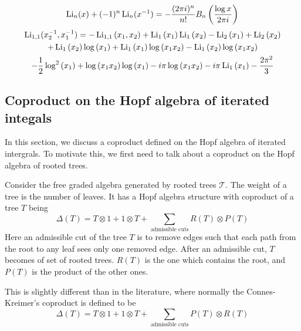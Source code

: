 \begin{example}
\begin{equation}\label{eq: Goncharov inversion depth 1}
\operatorname{Li}_n(x)+(-1)^n\operatorname{Li}_n(x^{-1})=-\dfrac{(2\pi i)^n}{n!}B_n\left(\frac{\log x}{2\pi i}\right)
\end{equation}
\begin{multline}\label{eq: Goncharov inversion depth 2}
\operatorname{Li}_{1,1}(x_2^{-1},x_1^{-1})=-\operatorname{Li}_{1,1}\left(x_1,x_2\right)+\operatorname{Li}_1\left(x_1\right)\operatorname{Li}_1\left(x_2\right)-\operatorname{Li}_2\left(x_1\right)+\operatorname{Li}_2\left(x_2\right)\\
+\operatorname{Li}_1\left(x_2\right) \log \left(x_1\right)+\operatorname{Li}_1\left(x_1\right) \log\left(x_1 x_2\right)-\operatorname{Li}_1\left(x_2\right) \log \left(x_1 x_2\right)\\
-\frac{1}{2} \log ^2\left(x_1\right)+\log \left(x_1 x_2\right) \log \left(x_1\right)-i \pi\log \left(x_1 x_2\right)-i \pi  \operatorname{Li}_1\left(x_1\right)-\frac{2 \pi ^2}{3}
\end{multline}
\end{example}

\subsection{Coproduct on the Hopf algebra of iterated integals}

In this section, we discuss a coproduct defined on the Hopf algebra of iterated intergrals. To motivate this, we first need to talk about a coproduct on the Hopf algebra of rooted trees.

\begin{theorem}
Consider the free graded algebra generated by rooted trees $\mathcal T$. The weight of a tree is the number of leaves. It has a Hopf algebra structure with coproduct of a tree $T$ being
\begin{equation}
\Delta(T)=T\otimes 1+1\otimes T+\sum_{\text{admissible cuts}}R(T)\otimes P(T)
\end{equation}
Here an admissible cut of the tree $T$ is to remove edges such that each path from the root to any leaf sees only one removed edge. After an admissible cut, $T$ becomes of set of rooted trees. $R(T)$ is the one which contains the root, and $P(T)$ is the product of the other ones.
\end{theorem}

\begin{remark}
This is slightly different than in the literature, where normally the Connes-Kreimer's coproduct is defined to be
\[
\Delta(T)=T\otimes 1+1\otimes T+\sum_{\text{admissible cuts}}P(T)\otimes R(T)
\]
\end{remark}

